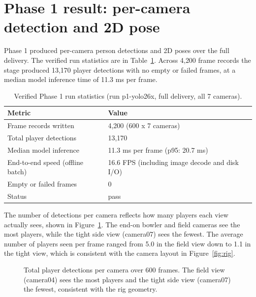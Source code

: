 \documentclass[oneside,openany]{book}
\begin{document}
\section{Phase 1 result: per-camera detection and 2D pose}
Phase 1 produced per-camera person detections and 2D poses over the full delivery. The verified
run statistics are in Table~\ref{tab:phase1}. Across 4{,}200 frame records the stage produced
13{,}170 player detections with no empty or failed frames, at a median model inference time of
11.3 ms per frame.

\begin{table}[!h]
	\begin{center}
		\caption{Verified Phase 1 run statistics (run p1-yolo26x, full delivery, all 7 cameras).}
		\label{tab:phase1}
		\footnotesize
		\begin{tabular}{p{6.5cm}p{6.0cm}}
			\toprule
			\textbf{Metric} & \textbf{Value} \\
			\midrule
			Frame records written & 4{,}200 (600 x 7 cameras) \\
			Total player detections & 13{,}170 \\
			Median model inference & 11.3 ms per frame (p95: 20.7 ms) \\
			End-to-end speed (offline batch) & 16.6 FPS (including image decode and disk I/O) \\
			Empty or failed frames & 0 \\
			Status & pass \\
			\bottomrule
		\end{tabular}
	\end{center}
\end{table}

The number of detections per camera reflects how many players each view actually sees, shown in
Figure~\ref{fig:detbars}. The end-on bowler and field cameras see the most players, while the
tight side view (camera07) sees the fewest. The average number of players seen per frame ranged
from 5.0 in the field view down to 1.1 in the tight view, which is consistent with the camera
layout in Figure~\ref{fig:rig}.

\begin{figure}[ht]
\begin{center}
\caption{Total player detections per camera over 600 frames. The field view (camera04) sees the
most players and the tight side view (camera07) the fewest, consistent with the rig geometry.}
\label{fig:detbars}
\end{center}
\end{figure}
\end{document}
